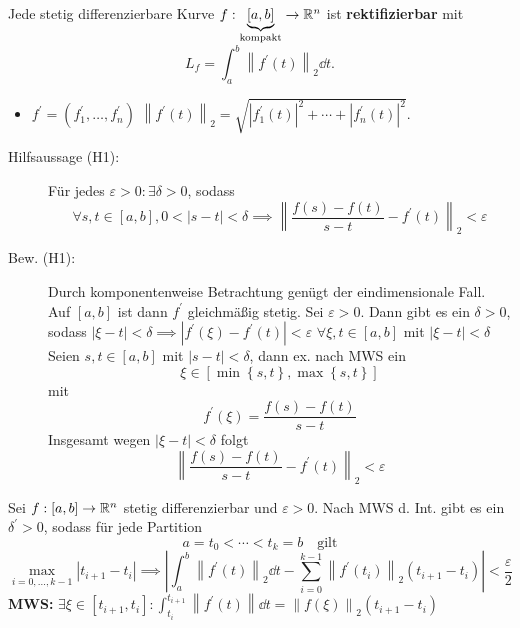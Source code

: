 \begin{theorem}
	Jede stetig differenzierbare Kurve $ f : \underbrace{[a, b]}_{\text{kompakt} } \to \mathbb{R} ^n $ ist \textbf{rektifizierbar} mit
	\[
		L_f = \int_{a}^{b} \left\| f^\prime (t) \right\| _2 \dd t.
	\]
	\begin{itemize}
		\item $ f^\prime  = \left( f_1^\prime , \dotsc, f_n^\prime  \right)  $ $ \left\| f^\prime (t) \right\| _2 = \sqrt{\left| f_1^\prime (t) \right| ^2 + \dotsb + \left| f_n^\prime (t) \right| ^2}  $.
	\end{itemize}
\end{theorem}
\begin{proof*}
	\begin{description}
		\item[Hilfsaussage (H1):] Für jedes $ \varepsilon > 0 : \exists \delta > 0 $, sodass
			\[
				\forall s, t \in [a, b], 0 < \left| s - t \right| < \delta \implies \left\| \frac{f(s) - f(t)}{ s - t }  - f^\prime (t) \right\|_2 < \varepsilon 
			\]
		\item[Bew. (H1):] Durch komponentenweise Betrachtung genügt der eindimensionale Fall.
			Auf $ [a, b] $ ist dann $ f^\prime  $ gleichmäßig stetig.
			Sei $ \varepsilon > 0 $.
			Dann gibt es ein $ \delta > 0 $, sodass $ \left| \xi - t \right| < \delta \implies \left| f^\prime (\xi) - f^\prime (t) \right| < \varepsilon  $ $ \forall \xi, t \in [a, b] $ mit $ \left| \xi - t \right| < \delta $
			Seien $ s, t \in [a, b] $ mit $ \left| s - t \right| < \delta $, dann ex. nach MWS ein
			\[
				\xi \in [ \min \left\{ s, t \right\} , \max \left\{ s, t \right\} ]
			\]
			mit
			\[
				f^\prime (\xi) = \frac{ f(s) - f(t) }{ s - t } 
			\]
			Insgesamt wegen $ \left| \xi - t \right| < \delta $ folgt
			\[
				\left\| \frac{ f(s) - f(t) }{ s - t } - f^\prime (t) \right\| _2 < \varepsilon 
			\]
	\end{description}
	Sei $ f : [a, b] \to \mathbb{R} ^n $ stetig differenzierbar und $ \varepsilon > 0 $.
	Nach MWS d. Int. gibt es ein $ \delta^\prime  > 0 $, sodass für jede Partition
	\[
		a = t_0 < \dotsb < t_k = b \quad \text{gilt} 
	\]
	\[
		\max_{i = 0, \dotsc, k - 1} \left| t_{i + 1} - t_{i}  \right| \implies \left| \int_{a}^{b} \left\| f^\prime (t) \right\| _2 \dd t - \sum_{i=0}^{k - 1} \left\| f^\prime (t_i) \right\| _2(t_{i + 1} - t_i) \right| < \frac{ \varepsilon }{ 2 } 
	\]
	{\color{gadse-red}
		\textbf{MWS:} $ \exists \xi \in [t_{i + 1} , t_{i} ] : \int_{t_i}^{t_{i + 1} } \left\| f^\prime (t) \right\| \dd t = \left\| f(\xi) \right\| _{2} (t_{i + 1} - t_i) $ 
}
\end{proof*}
